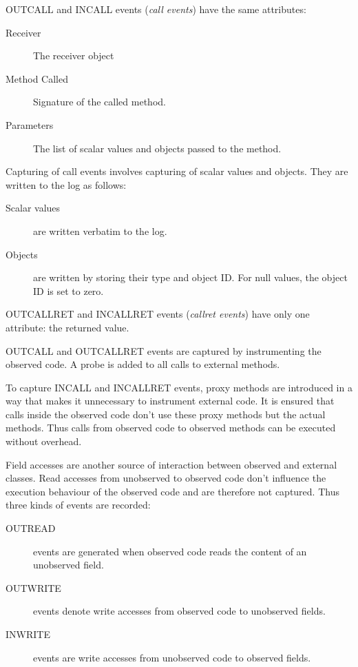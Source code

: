 OUTCALL and INCALL events (\emph {call events})  have the same attributes:

\begin{description}
 \item [Receiver] The receiver object
 \item [Method Called] Signature of the called method.
 \item [Parameters] The list of scalar values and objects passed to the method.
\end{description}

Capturing of call events involves capturing of scalar values and objects. They are written to the log as follows:

\begin{description}
 \item [Scalar values] are written verbatim to the log.
 \item [Objects] are written by storing their type and object ID. For null values, the object ID is set to zero. 
\end{description}

OUTCALLRET and INCALLRET events (\emph{callret events}) have only one attribute: the returned value.

OUTCALL and OUTCALLRET events are captured by instrumenting the observed code. A probe is added to all calls to external methods.

To capture INCALL and INCALLRET events, proxy methods are introduced in a way that makes it unnecessary to instrument external code. It is ensured that calls inside the observed code don't use these proxy methods but the actual methods. Thus calls from observed code to observed methods can be executed without overhead.

Field accesses are another source of interaction between observed and external classes. Read accesses from unobserved to observed code don't influence the execution behaviour of the observed code and are therefore not captured. Thus three kinds of events are recorded:

\begin{description}
 \item [OUTREAD] events are generated when observed code reads the content of an unobserved field.
 \item [OUTWRITE] events denote write accesses from observed code to unobserved fields.
 \item [INWRITE] events are write accesses from unobserved code to observed fields.
\end{description}

